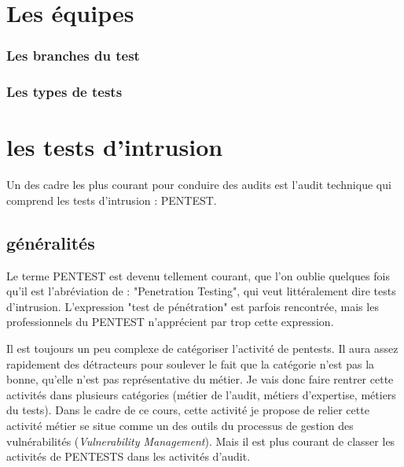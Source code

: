 \section{Les équipes}

\begin{frame}
\frametitle<presentation>{Les branches du test}
\end{frame}



\begin{frame}
\frametitle<presentation>{Les types de tests}
\end{frame}


\section{les tests d'intrusion}

Un des cadre les plus courant pour conduire des audits est l'audit technique qui comprend les tests d'intrusion : PENTEST.

\subsection{généralités}

Le terme PENTEST est devenu tellement courant, que l'on oublie quelques fois qu'il est l'abréviation de : "Penetration Testing", qui  veut littéralement dire tests d'intrusion.  L'expression  "test de pénétration" est parfois rencontrée, mais les professionnels du PENTEST n'apprécient par trop cette expression. 

Il est toujours un peu complexe de catégoriser l'activité de pentests. Il aura assez rapidement des détracteurs pour soulever le fait que la catégorie n'est pas la bonne, qu'elle n'est pas représentative du métier. 
Je vais donc faire rentrer cette activités dans plusieurs catégories (métier de l'audit, métiers d'expertise, métiers du tests).
Dans le cadre de ce cours, cette activité je propose de relier cette activité métier se situe comme un des outils du processus de gestion des vulnérabilités (\emph{Vulnerability Management}).  Mais il est plus courant de  classer les activités de PENTESTS dans les activités d'audit.

